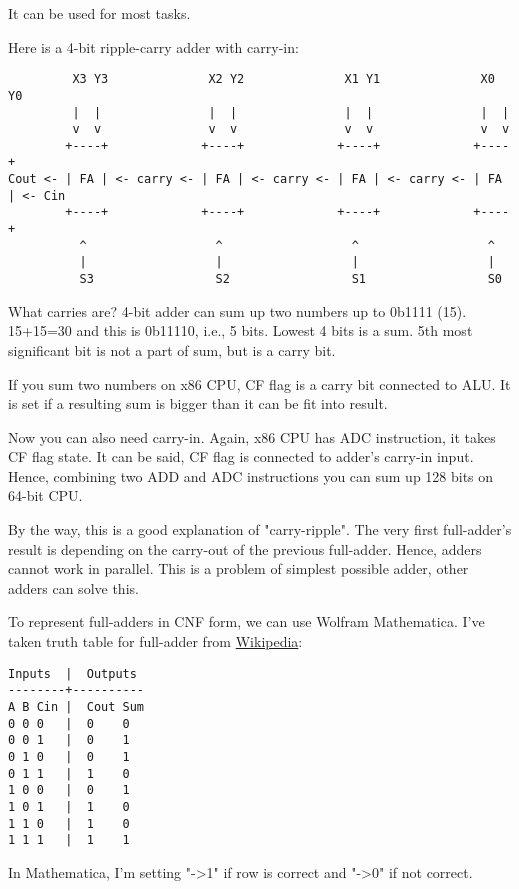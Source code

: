 It can be used for most tasks.

Here is a 4-bit ripple-carry adder with carry-in:

\begin{lstlisting}
         X3 Y3              X2 Y2              X1 Y1              X0 Y0
         |  |               |  |               |  |               |  |
         v  v               v  v               v  v               v  v
        +----+             +----+             +----+             +----+
Cout <- | FA | <- carry <- | FA | <- carry <- | FA | <- carry <- | FA | <- Cin
        +----+             +----+             +----+             +----+
          ^                  ^                  ^                  ^
          |                  |                  |                  |
          S3                 S2                 S1                 S0
\end{lstlisting}

What carries are?
4-bit adder can sum up two numbers up to 0b1111 (15).
15+15=30 and this is 0b11110, i.e., 5 bits. Lowest 4 bits is a sum.
5th most significant bit is not a part of sum, but is a carry bit.

If you sum two numbers on x86 CPU, CF flag is a carry bit connected to \ac{ALU}.
It is set if a resulting sum is bigger than it can be fit into result.

Now you can also need carry-in.
Again, x86 CPU has ADC instruction, it takes CF flag state.
It can be said, CF flag is connected to adder's carry-in input.
Hence, combining two ADD and ADC instructions you can sum up 128 bits on 64-bit CPU.

By the way, this is a good explanation of "carry-ripple".
The very first full-adder's result is depending on the carry-out of the previous full-adder.
Hence, adders cannot work in parallel.
This is a problem of simplest possible adder, other adders can solve this.

To represent full-adders in CNF form, we can use Wolfram Mathematica.
I've taken truth table for full-adder from \href{https://en.wikipedia.org/wiki/Adder_(electronics)}{Wikipedia}:

\begin{lstlisting}
Inputs 	|  Outputs
--------+----------
A B Cin |  Cout Sum
0 0 0   |  0    0
0 0 1   |  0    1
0 1 0   |  0    1
0 1 1   |  1    0
1 0 0   |  0    1
1 0 1   |  1    0
1 1 0   |  1    0
1 1 1   |  1    1
\end{lstlisting}

In Mathematica, I'm setting "->1" if row is correct and "->0" if not correct.

